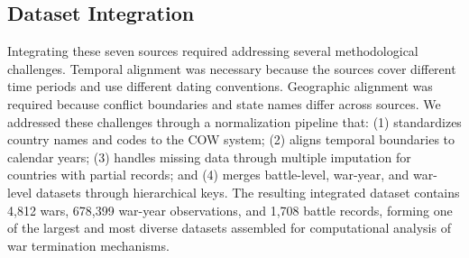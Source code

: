 \subsection{Dataset Integration}

Integrating these seven sources required addressing several methodological challenges. Temporal alignment was necessary because the sources cover different time periods and use different dating conventions. Geographic alignment was required because conflict boundaries and state names differ across sources. We addressed these challenges through a normalization pipeline that: (1) standardizes country names and codes to the COW system; (2) aligns temporal boundaries to calendar years; (3) handles missing data through multiple imputation for countries with partial records; and (4) merges battle-level, war-year, and war-level datasets through hierarchical keys. The resulting integrated dataset contains 4,812 wars, 678,399 war-year observations, and 1,708 battle records, forming one of the largest and most diverse datasets assembled for computational analysis of war termination mechanisms.
